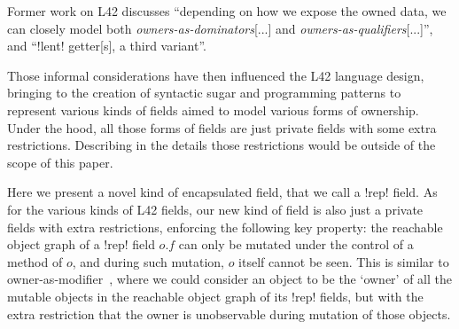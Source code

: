 


Former work on L42 discusses ``depending on how we expose the owned data, we can closely model both \emph{owners-as-dominators}[...] and \emph{owners-as-qualifiers}[...]''\cite{GIANNINI2019145}, and  ``\Q!lent! getter[s], a third variant''\cite{GIANNINI2019145}.%

Those informal considerations have then influenced the L42 language design,
bringing to the creation of syntactic sugar and programming patterns to represent various kinds of \Q@capsule@ fields aimed to model various forms of ownership. Under the hood, all those forms of \Q@capsule@ fields are just private \Q@mut@ fields with some extra restrictions. Describing in the details those restrictions would be outside of the scope of this paper.

Here we present a novel kind of encapsulated field, that we call a  \Q!rep! field.
As for the various kinds of L42 \Q@capsule@ fields, our new kind of field is also just 
a private \Q@mut@ fields with extra restrictions,
enforcing the following key property:
the reachable object graph of a \Q!rep! field $o.f$ can only be mutated under the control of a \Q@mut@ method of $o$, and during such mutation, $o$ itself cannot be seen.
This is similar to owner-as-modifier~\cite{Dietl05universes:lightweight,10.1007/978-3-540-92188-2_4}, 
where we could consider an object to be the `owner' of all the mutable objects in the reachable object graph of its \Q!rep! fields, but with the extra restriction that the owner is unobservable during mutation of those objects.

